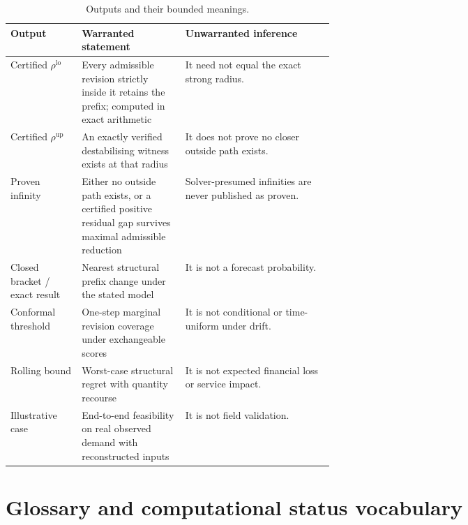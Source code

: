 \documentclass[11pt]{article}
\theoremstyle{definition}
\newcommand{\rholo}{\rho^{\mathrm{lo}}}
\newcommand{\rhohi}{\rho^{\mathrm{up}}}
\begin{document}
\begin{table}[htbp]
\centering
\caption{Outputs and their bounded meanings.}
\label{tab:outputs}
\begin{tabularx}{\linewidth}{@{}p{0.22\linewidth}p{0.32\linewidth}X@{}}
\toprule
Output & Warranted statement & Unwarranted inference \\
\midrule
Certified $\rholo$ & Every admissible revision strictly inside it retains the prefix; computed in exact arithmetic & It need not equal the exact strong radius. \\
Certified $\rhohi$ & An exactly verified destabilising witness exists at that radius & It does not prove no closer outside path exists. \\
Proven infinity & Either no outside path exists, or a certified positive residual gap survives maximal admissible reduction & Solver-presumed infinities are never published as proven. \\
Closed bracket / exact result & Nearest structural prefix change under the stated model & It is not a forecast probability. \\
Conformal threshold & One-step marginal revision coverage under exchangeable scores & It is not conditional or time-uniform under drift. \\
Rolling bound & Worst-case structural regret with quantity recourse & It is not expected financial loss or service impact. \\
Illustrative case & End-to-end feasibility on real observed demand with reconstructed inputs & It is not field validation. \\
\bottomrule
\end{tabularx}
\end{table}

\section{Glossary and computational status vocabulary}\label{sec:glossary}
\end{document}
